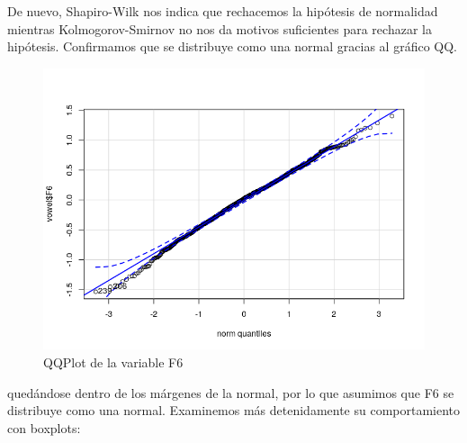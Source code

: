 De nuevo, Shapiro-Wilk nos indica que rechacemos la hipótesis de normalidad mientras Kolmogorov-Smirnov no nos da motivos suficientes para rechazar la hipótesis. Confirmamos que se distribuye como una normal gracias al gráfico QQ.

\begin{figure}[H] %
	\centering
	\includegraphics[scale=0.6]{qq-F6.png}  %
	\caption{QQPlot de la variable F6} 
	\label{fig:qq-F6}
\end{figure}

quedándose dentro de los márgenes de la normal, por lo que asumimos que F6 se distribuye como una normal. Examinemos más detenidamente su comportamiento con boxplots:

